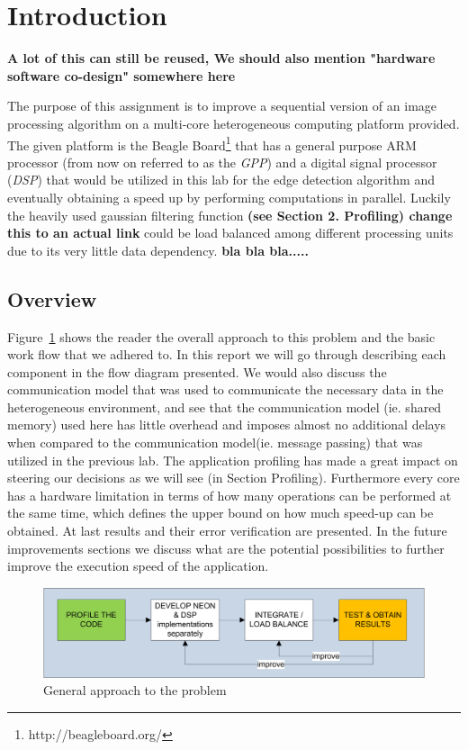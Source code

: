 \newpage
\section{Introduction}

\textbf{A lot of this can still be reused,  We should also mention "hardware software co-design" somewhere here}


The purpose of this assignment is to improve a sequential version of an image processing algorithm on a multi-core heterogeneous computing platform provided. The given platform is the Beagle Board\footnote{http://beagleboard.org/} that has a general purpose ARM processor (from now on referred to as the \emph{GPP}) and a digital signal processor (\emph{DSP}) that would be utilized in this lab for the edge detection algorithm and eventually obtaining a speed up by performing computations in parallel. Luckily the heavily used gaussian filtering function \textbf{(see Section 2. Profiling) change this to an actual link} could be load balanced among different processing units due to its very little data dependency. \textbf{bla bla bla..... }



\subsection{Overview}

Figure~\ref{fig:workflow} shows the reader the overall approach to this problem and the basic work flow that we adhered to. In this report we will go through describing each component in the flow diagram presented. We would also discuss the communication model that was used to communicate the necessary data in the heterogeneous environment, and see that the communication model (ie. shared memory) used here has little overhead and imposes almost no additional delays when compared to the communication model(ie. message passing) that was utilized in the previous lab. The application profiling has made a great impact on steering our decisions as we will see (in Section Profiling). Furthermore every core has a hardware limitation in terms of how many operations can be performed at the same time, which defines the upper bound on how much speed-up can be obtained. At last results and their error verification are presented. In the future improvements sections we discuss what are the potential possibilities to further improve the execution speed of the application.




\begin{figure}
\includegraphics[width=\textwidth]{drawings/workflow}
\caption{General approach to the problem}
\label{fig:workflow}
\end{figure}



